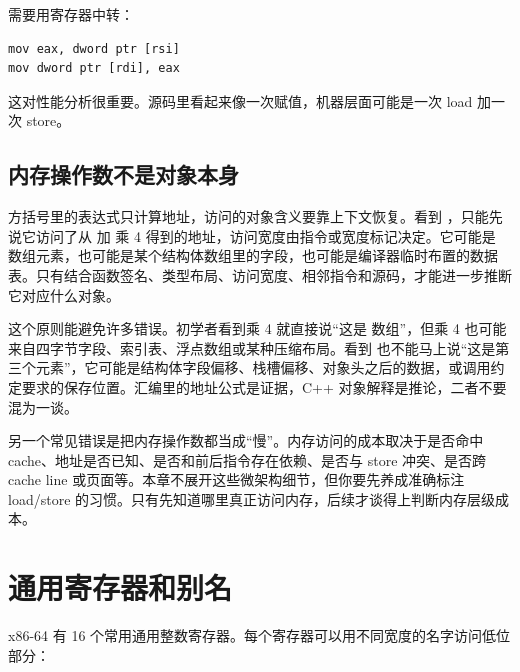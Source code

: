 需要用寄存器中转：

\begin{lstlisting}
mov eax, dword ptr [rsi]
mov dword ptr [rdi], eax
\end{lstlisting}

这对性能分析很重要。源码里看起来像一次赋值，机器层面可能是一次 load 加一次 store。

\subsection{内存操作数不是对象本身}

方括号里的表达式只计算地址，访问的对象含义要靠上下文恢复。看到 ，只能先说它访问了从  加  乘 4 得到的地址，访问宽度由指令或宽度标记决定。它可能是  数组元素，也可能是某个结构体数组里的字段，也可能是编译器临时布置的数据表。只有结合函数签名、类型布局、访问宽度、相邻指令和源码，才能进一步推断它对应什么对象。

这个原则能避免许多错误。初学者看到乘 4 就直接说“这是  数组”，但乘 4 也可能来自四字节字段、索引表、浮点数组或某种压缩布局。看到  也不能马上说“这是第三个元素”，它可能是结构体字段偏移、栈槽偏移、对象头之后的数据，或调用约定要求的保存位置。汇编里的地址公式是证据，C++ 对象解释是推论，二者不要混为一谈。

另一个常见错误是把内存操作数都当成“慢”。内存访问的成本取决于是否命中 cache、地址是否已知、是否和前后指令存在依赖、是否与 store 冲突、是否跨 cache line 或页面等。本章不展开这些微架构细节，但你要先养成准确标注 load/store 的习惯。只有先知道哪里真正访问内存，后续才谈得上判断内存层级成本。

\section{通用寄存器和别名}

x86-64 有 16 个常用通用整数寄存器。每个寄存器可以用不同宽度的名字访问低位部分：

